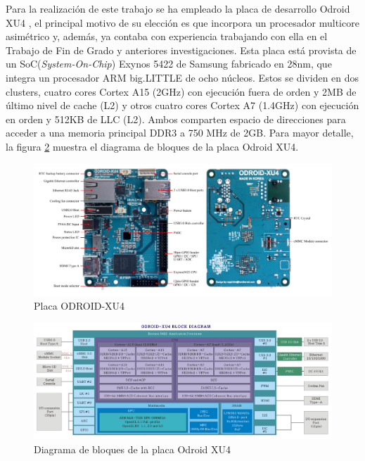 Para la realización de este trabajo se ha empleado la placa de desarrollo Odroid XU4 \cite{odroid-manual}, el principal motivo de su elección es que incorpora un procesador multicore asimétrico y, además, ya contaba con experiencia trabajando con ella en el Trabajo de Fin de Grado y anteriores investigaciones. Esta placa está provista de un SoC(\emph{System-On-Chip}) Exynos 5422 de Samsung fabricado en 28nm, que integra un procesador ARM big.LITTLE de ocho núcleos. Estos se dividen en dos clusters, cuatro cores Cortex A15 (2GHz) con ejecución fuera de orden y 2MB de último nivel de cache (L2) y otros cuatro cores Cortex A7 (1.4GHz) con ejecución en orden y 512KB de LLC (L2). Ambos comparten espacio de direcciones para acceder a una memoria principal DDR3 a 750 MHz de 2GB. Para mayor detalle, la figura \ref{fig:diagramaDeBloquesXU4} muestra el diagrama de bloques de la placa Odroid XU4.

\begin{figure}[tbp]
    \centering
    \includegraphics[width=1\textwidth]{foto_placa_XU4.png}
    \caption{Placa ODROID-XU4}
    \label{fig:fotoPlacaXU4}
\end{figure}

\begin{figure}[tbp]
    \centering
    \includegraphics[width=1\textwidth]{diagrama_de_bloques_ODROID_XU4.png}
    \caption{Diagrama de bloques de la placa Odroid XU4}
    \label{fig:diagramaDeBloquesXU4}
\end{figure}


